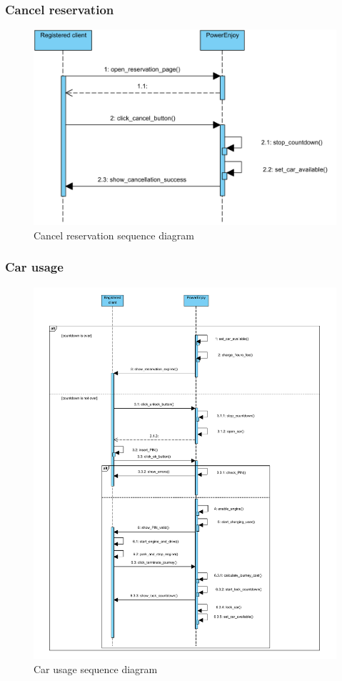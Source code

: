 \subsubsection{Cancel reservation}
\begin{figure}[H]
\centering
\includegraphics[width=\textwidth, keepaspectratio]{../images/diagram/sequence/cancel_reservation.pdf}
\caption{Cancel reservation sequence diagram}
\end{figure}


\subsubsection{Car usage}
\begin{figure}[H]
\centering
\includegraphics[width=\textwidth, keepaspectratio]{../images/diagram/sequence/car_usage.pdf}
\caption{Car usage sequence diagram}
\end{figure}


